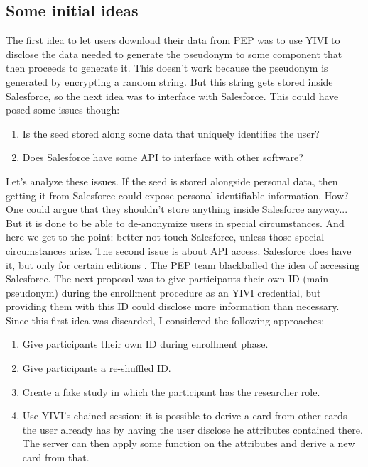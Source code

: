 \documentclass{report}
\begin{document}
\subsection{Some initial ideas}
The first idea to let users download their data from PEP was to use YIVI to disclose the data needed to generate the pseudonym to some component that then proceeds to generate it.
This doesn't work because the pseudonym is generated by encrypting a random string. But this string gets stored inside Salesforce, so the next idea was to interface with
Salesforce. This could have posed some issues though:
\begin{enumerate}
		\item Is the seed stored along some data that uniquely identifies the user?
		\item Does Salesforce have some API to interface with other software?
\end{enumerate}
Let's analyze these issues. If the seed is stored alongside personal data, then getting it from Salesforce could expose personal identifiable information. How? One could argue that
they shouldn't store anything inside Salesforce anyway... But it is done to be able to de-anonymize users in special circumstances. And here we get to the point: better not touch
Salesforce, unless those special circumstances arise. The second issue is about API access. Salesforce does have it, but only for certain editions \cite{salesforce}. The PEP team
blackballed the idea of accessing Salesforce. The next proposal was to give participants their own ID (main pseudonym) during the enrollment procedure as an YIVI credential, but
providing them with this ID could disclose more information than necessary.
Since this first idea was discarded, I considered the following approaches:
\begin{enumerate}
		\item Give participants their own ID during enrollment phase.
		\item Give participants a re-shuffled ID.
		\item Create a fake study in which the participant has the researcher role.
		\item Use YIVI’s chained session: it is possible to derive a card from other cards the user already has by having the user disclose he attributes contained there. The server can then apply some function on the attributes and derive a new card from that.
\end{enumerate}
\end{document}
